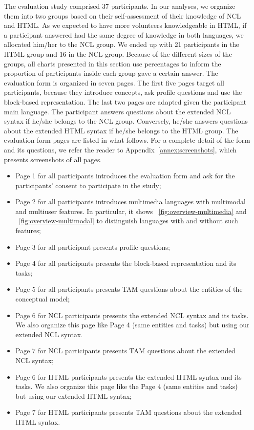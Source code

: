 \documentclass[
  doutorado,
  american
]{ThesisPUC}
\newcommand{\fig}[1]{\figurename~\ref{#1}}
\newcommand{\appen}[1]{Appendix~\ref{#1}}
\begin{document}
The evaluation study comprised 37 participants. In our analyses, we organize
them into two groups based on their self-assessment of their knowledge of NCL
and HTML. As we expected to have more volunteers knowledgeable in HTML, if a
participant answered had the same degree of knowledge in both languages, we
allocated him/her to the NCL group. We ended up with 21 participants in the HTML
group and 16 in the NCL group. Because of the different sizes of the groups, all
charts presented in this section use percentages to inform the proportion of
participants inside each group gave a certain answer. The evaluation form is
organized in seven pages. The first five pages target all participants, because
they introduce concepts, ask profile questions and use the block-based
representation. The last two pages are adapted given the participant main
language. The participant answers questions about the extended NCL syntax if
he/she belongs to the NCL group. Conversely, he/she answers questions about the
extended HTML syntax if he/she belongs to the HTML group. The evaluation form
pages are listed in what follows. For a complete detail of the form and its
questions, we refer the reader to \appen{annex:screenshots}, which presents screenshots of
all pages.

\begin{itemize}
	\item Page 1 for all participants introduces the evaluation form and ask for
	the participants’ consent to participate in the study;
	\item Page 2 for all participants introduces multimedia languages with
	multimodal and multiuser features. In particular, it shows 
	\fig{fig:overview-multimedia} and \fig{fig:overview-multimodal} to distinguish
	languages with and without such features;
	\item Page 3 for all participant presents profile questions;
	\item Page 4 for all participants presents the block-based representation and
	its tasks; 
	\item Page 5 for all participants presents TAM questions about the entities of
	the conceptual model;
	\item Page 6 for NCL participants presents the extended NCL syntax and its
	tasks. We also organize this page like Page 4 (same entities and tasks) but
	using our extended NCL syntax.
	\item Page 7 for NCL participants presents TAM questions about the extended
	NCL syntax;
	\item Page 6 for HTML participants presents the extended HTML syntax and its
	tasks. We also organize this page like the Page 4 (same entities and tasks)
	but using our extended HTML syntax;
	\item Page 7 for HTML participants presents TAM questions about the extended
	HTML syntax.
\end{itemize}
\end{document}
